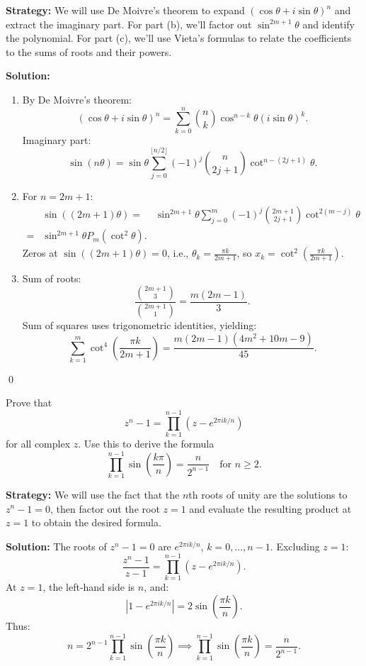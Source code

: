 \noindent\textbf{Strategy:} We will use De Moivre's theorem to expand $(\cos \theta + i \sin \theta)^n$ and extract the imaginary part. For part (b), we'll factor out $\sin^{2m+1} \theta$ and identify the polynomial. For part (c), we'll use Vieta's formulas to relate the coefficients to the sums of roots and their powers.

\bigskip\noindent\textbf{Solution:}
\begin{enumerate}[label=\textbf{(\alph*)}]
\item By De Moivre's theorem:
\[
(\cos \theta + i \sin \theta)^n = \sum_{k=0}^n \binom{n}{k} \cos^{n-k} \theta (i \sin \theta)^k.
\]
Imaginary part:
\[
\sin(n\theta) = \sin \theta \sum_{j=0}^{\lfloor n/2 \rfloor} (-1)^j \binom{n}{2j+1} \cot^{n-(2j+1)} \theta.
\]
\item For \( n = 2m+1 \):
\begin{align*}
& \sin((2m+1)\theta) 
=& \sin^{2m+1} \theta \sum_{j=0}^m (-1)^j \binom{2m+1}{2j+1} \cot^{2(m-j)} \theta \\
=& \sin^{2m+1} \theta P_m(\cot^2 \theta).
\end{align*}
Zeros at \( \sin((2m+1)\theta) = 0 \), i.e., \( \theta_k = \frac{\pi k}{2m+1} \), so \( x_k = \cot^2 \left( \frac{\pi k}{2m+1} \right) \).
\item Sum of roots:
\[
\frac{\binom{2m+1}{3}}{\binom{2m+1}{1}} = \frac{m(2m-1)}{3}.
\]
Sum of squares uses trigonometric identities, yielding:
\[
\sum_{k=1}^m \cot^4 \left( \frac{\pi k}{2m+1} \right) = \frac{m(2m-1)(4m^2 + 10m - 9)}{45}.
\]
\end{enumerate}\qed


\begin{problembox}
\begin{problemstatement}
Prove that
\[
z^n - 1 = \prod_{k=1}^{n-1} \left(z - e^{2\pi i k/n}\right)
\]
for all complex \( z \). Use this to derive the formula
\[
\prod_{k=1}^{n-1} \sin \left( \frac{k\pi}{n} \right) = \frac{n}{2^{n-1}} \quad \text{for } n \geq 2.
\]
\end{problemstatement}
\end{problembox}

\noindent\textbf{Strategy:} We will use the fact that the $n$th roots of unity are the solutions to $z^n - 1 = 0$, then factor out the root $z = 1$ and evaluate the resulting product at $z = 1$ to obtain the desired formula.

\bigskip\noindent\textbf{Solution:}
The roots of \( z^n - 1 = 0 \) are \( e^{2\pi i k/n} \), \( k = 0, \ldots, n-1 \). Excluding \( z = 1 \):
\[
\frac{z^n - 1}{z - 1} = \prod_{k=1}^{n-1} (z - e^{2\pi i k/n}).
\]
At \( z = 1 \), the left-hand side is \( n \), and:
\[
|1 - e^{2\pi i k/n}| = 2 \sin\left( \frac{\pi k}{n} \right).
\]
Thus:
\[
n = 2^{n-1} \prod_{k=1}^{n-1} \sin\left( \frac{\pi k}{n} \right) \implies \prod_{k=1}^{n-1} \sin\left( \frac{\pi k}{n} \right) = \frac{n}{2^{n-1}}.
\]

